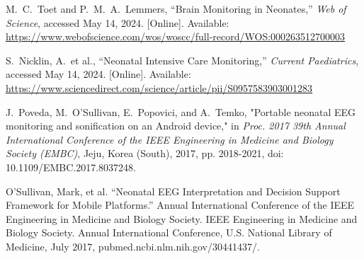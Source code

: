 \documentclass[12pt,journal,compsoc]{IEEEtran}
\begin{document}
\begin{thebibliography}{1}

M.~C.~Toet and P.~M.~A.~Lemmers, “Brain Monitoring in Neonates,” \emph{Web of Science}, accessed May 14, 2024. [Online]. Available: \url{https://www.webofscience.com/wos/woscc/full-record/WOS:000263512700003}

S.~Nicklin, A.~et al., “Neonatal Intensive Care Monitoring,” \emph{Current Paediatrics}, accessed May 14, 2024. [Online]. Available: \url{https://www.sciencedirect.com/science/article/pii/S0957583903001283}

J.~Poveda, M.~O'Sullivan, E.~Popovici, and A.~Temko, "Portable neonatal EEG monitoring and sonification on an Android device," in \emph{Proc. 2017 39th Annual International Conference of the IEEE Engineering in Medicine and Biology Society (EMBC)}, Jeju, Korea (South), 2017, pp. 2018-2021, doi: 10.1109/EMBC.2017.8037248.

O’Sullivan, Mark, et al. “Neonatal EEG Interpretation and Decision Support Framework for Mobile Platforms.” Annual International Conference of the IEEE Engineering in Medicine and Biology Society. IEEE Engineering in Medicine and Biology Society. Annual International Conference, U.S. National Library of Medicine, July 2017, pubmed.ncbi.nlm.nih.gov/30441437/. 

\end{thebibliography}
\end{document}
